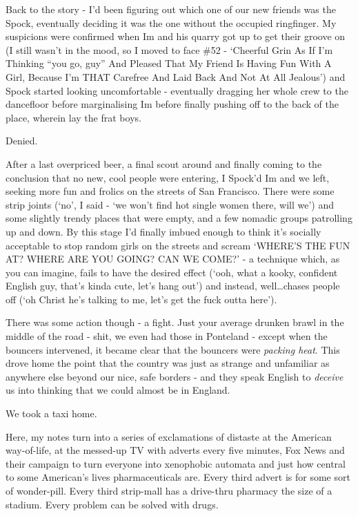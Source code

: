 \documentclass[a5paper,titlepage,draft]{book}
\begin{document}
Back to the story - I'd been figuring out which one of our new friends was the Spock, eventually deciding it was the one without the occupied ringfinger.  My suspicions were confirmed when Im and his quarry got up to get their groove on (I still wasn't in the mood, so I moved to face \#52 - `Cheerful Grin As If I'm Thinking ``you go, guy'' And Pleased That My Friend Is Having Fun With A Girl, Because I'm THAT Carefree And Laid Back And Not At All Jealous') and Spock started looking uncomfortable - eventually dragging her whole crew to the dancefloor before marginalising Im before finally pushing off to the back of the place, wherein lay the frat boys.

Denied.

After a last overpriced beer, a final scout around and finally coming to the conclusion that no new, cool people were entering, I Spock'd Im and we left, seeking more fun and frolics on the streets of San Francisco.  There were some strip joints (`no', I said - `we won't find hot single women there, will we') and some slightly trendy places that were empty, and a few nomadic groups patrolling up and down.  By this stage I'd finally imbued enough to think it's socially acceptable to stop random girls on the streets and scream `WHERE'S THE FUN AT?  WHERE ARE YOU GOING?  CAN WE COME?' - a technique which, as you can imagine, fails to have the desired effect (`ooh, what a kooky, confident English guy, that's kinda cute, let's hang out') and instead, well\ldots chases people off (`oh Christ he's talking to me, let's get the fuck outta here').

There was some action though - a fight.  Just your average drunken brawl in the middle of the road - shit, we even had those in Ponteland - except when the bouncers intervened, it became clear that the bouncers were \emph{packing heat}.  This drove home the point that the country was just as strange and unfamiliar as anywhere else beyond our nice, safe borders - and they speak English to \emph{deceive} us into thinking that we could almost be in England.

We took a taxi home.

Here, my notes turn into a series of exclamations of distaste at the American way-of-life, at the messed-up TV with adverts every five minutes, Fox News and their campaign to turn everyone into xenophobic automata and just how central to some American's lives pharmaceuticals are.  Every third advert is for some sort of wonder-pill.  Every third strip-mall has a drive-thru pharmacy the size of a stadium.  Every problem can be solved with drugs.
\end{document}
